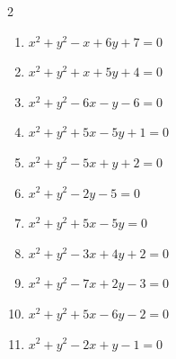 \begin{multicols}{2}
\begin{enumerate}
  \item $x^{2}+y^{2}-x+6y+7=0$


  \item $x^{2}+y^{2}+x+5y+4=0$


  \item $x^{2}+y^{2}-6x-y-6=0$


  \item $x^{2}+y^{2}+5x-5y+1=0$


  \item $x^{2}+y^{2}-5x+y+2=0$


  \item $x^{2}+y^{2}-2y-5=0$


  \item $x^{2}+y^{2}+5x-5y=0$


  \item $x^{2}+y^{2}-3x+4y+2=0$


  \item $x^{2}+y^{2}-7x+2y-3=0$


  \item $x^{2}+y^{2}+5x-6y-2=0$


  \item $x^{2}+y^{2}-2x+y-1=0$


\end{enumerate}
\end{multicols}
